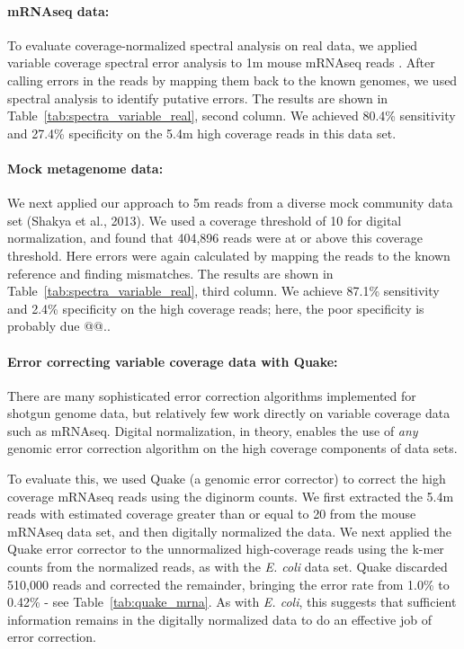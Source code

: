 \documentclass{article}
\begin{document}
\paragraph{mRNAseq data:}


To evaluate coverage-normalized spectral analysis on real data, we
applied variable coverage spectral error analysis to 1m mouse mRNAseq
reads \cite{Haas2013}.  After calling errors in the reads by mapping
them back to the known genomes, we used spectral analysis to identify
putative errors.  The results are shown in
Table~\ref{tab:spectra_variable_real}, second column.  We achieved
80.4\% sensitivity and 27.4\% specificity on the 5.4m high coverage
reads in this data set.

\paragraph{Mock metagenome data:}


We next applied our approach to 5m reads from a diverse mock community
data set (Shakya et al., 2013). We used a coverage threshold of 10 for
digital normalization, and found that 404,896 reads were at or above
this coverage threshold.  Here errors were again calculated by mapping
the reads to the known reference and finding mismatches.  The results
are shown in Table~\ref{tab:spectra_variable_real}, third column.  We
achieve 87.1\% sensitivity and 2.4\% specificity on the high coverage
reads; here, the poor specificity is probably due @@..

\paragraph{Error correcting variable coverage data with Quake:}


There are many sophisticated error correction algorithms implemented
for shotgun genome data, but relatively few work directly on variable
coverage data such as mRNAseq.  Digital normalization, in theory,
enables the use of {\em any} genomic error correction algorithm on the
high coverage components of data sets.

To evaluate this, we used Quake (a genomic error corrector) to correct
the high coverage mRNAseq reads using the diginorm counts.  We first
extracted the 5.4m reads with estimated coverage greater than or equal
to 20 from the mouse mRNAseq data set, and then digitally normalized
the data.  We next applied the Quake error corrector to the
unnormalized high-coverage reads using the k-mer counts from the
normalized reads, as with the {\em E. coli} data set.  Quake discarded
510,000 reads and corrected the remainder, bringing the error rate
from 1.0\% to 0.42\% - see Table~\ref{tab:quake_mrna}.  As with {\em
  E. coli}, this suggests that sufficient information remains in the
digitally normalized data to do an effective job of error correction.
\end{document}
